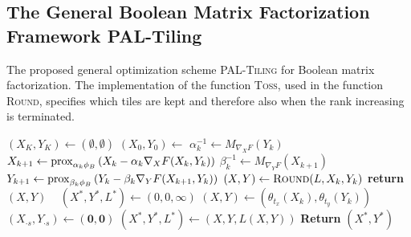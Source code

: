 \subsection{The General Boolean Matrix Factorization Framework PAL-Tiling }\label{sec:PT:vanillaAlg}
\begin{algorithm}[t]
\caption{The proposed general optimization scheme \textsc{PAL-Tiling} for Boolean matrix factorization. The implementation of the function \textsc{Toss}, used in the function \textsc{Round}, specifies which tiles are kept and therefore also when the rank increasing is terminated.}
\begin{algorithmic}[1]
    \State $(X_K,Y_K)\gets (\emptyset, \emptyset)$
    \State $(X_0,Y_0) \gets $  \label{alg:paltiling:increaseRank}
    \label{alg:paltiling:opt} 
    	\State $\alpha_k^{-1} \gets M_{\nabla_XF}(Y_k)$
        \State $X_{k+1} \gets \operatorname{prox}_{\alpha_k\phi_B}\left(X_k-\alpha_k\nabla_XF(X_k,Y_k)\right)$
       	\State $\beta_k^{-1} \gets M_{\nabla_YF}(X_{k+1})$
        \State $Y_{k+1} \gets \operatorname{prox}_{\beta_k\phi_B}\left(Y_k-\beta_k\nabla_YF(X_{k+1},Y_k)\right)$
    \EndFor
    \State $(X,Y)\gets \Call{Round}{L,X_k,Y_k}$  \label{alg:paltiling:round}
    	\textbf{return} $(X,Y)$
    \EndIIf \label{alg:paltiling:rankGap}
    \EndFor
  \EndFunction
  \Statex ~
  \State $(X^*,Y^*,L^*)\gets (0,0,\infty)$
    \State $(X,Y)\gets (\theta_{t_x}(X_k),\theta_{t_y}(Y_k))$
         $(X_{\cdot s},Y_{\cdot s})\gets (\mathbf{0},\mathbf{0})$ \label{alg:paltiling:toss}
        \EndIIf
    \EndFor
     $(X^*,Y^*,L^*)\gets (X,Y,L(X,Y))$
    \EndIIf
  \EndFor
  \State \textbf{Return} $(X^*,Y^*)$
  \EndFunction
\end{algorithmic}
\label{alg:paltiling}
\end{algorithm}
